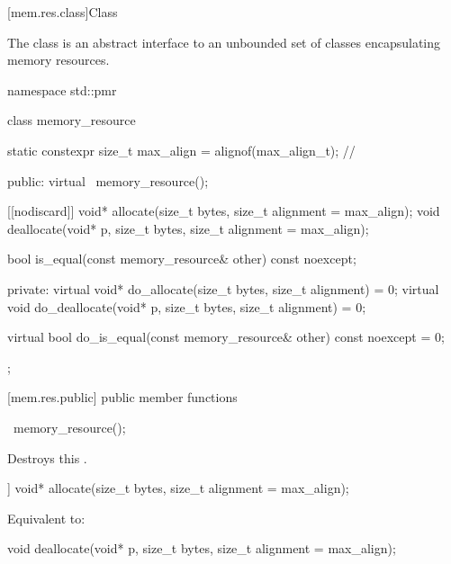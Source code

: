 [mem.res.class]{Class }

\pnum
The  class is an abstract interface to an unbounded set of classes encapsulating memory resources.

%
\begin{codeblock}
namespace std::pmr {
  class memory_resource {
    static constexpr size_t max_align = alignof(max_align_t);   // \expos

  public:
    virtual ~memory_resource();

    [[nodiscard]] void* allocate(size_t bytes, size_t alignment = max_align);
    void deallocate(void* p, size_t bytes, size_t alignment = max_align);

    bool is_equal(const memory_resource& other) const noexcept;

  private:
    virtual void* do_allocate(size_t bytes, size_t alignment) = 0;
    virtual void do_deallocate(void* p, size_t bytes, size_t alignment) = 0;

    virtual bool do_is_equal(const memory_resource& other) const noexcept = 0;
  };
}
\end{codeblock}


[mem.res.public]{ public member functions}

%
\begin{itemdecl}
~memory_resource();
\end{itemdecl}

\begin{itemdescr}
\pnum
\effects
Destroys this .
\end{itemdescr}

%
\begin{itemdecl}
[[nodiscard]] void* allocate(size_t bytes, size_t alignment = max_align);
\end{itemdecl}

\begin{itemdescr}
\pnum
\effects
Equivalent to: 
\end{itemdescr}

%
\begin{itemdecl}
void deallocate(void* p, size_t bytes, size_t alignment = max_align);
\end{itemdecl}

